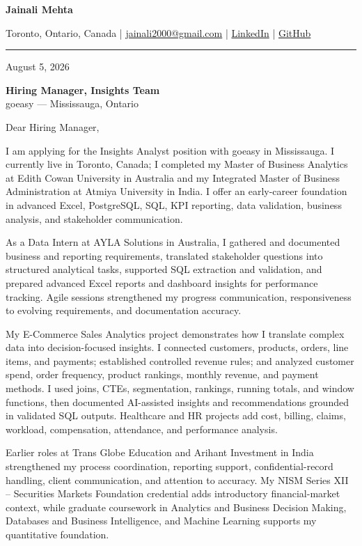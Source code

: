\documentclass[letterpaper,10pt]{article}
\begin{document}
\begin{center}
  {\fontsize{17}{19}\selectfont\textbf{Jainali Mehta}}\par\vspace{2pt}
  \small Toronto, Ontario, Canada \;|\;
  \href{mailto:jainali2000@gmail.com}{jainali2000@gmail.com} \;|\;
  \href{https://www.linkedin.com/in/jainali-mehta}{LinkedIn} \;|\;
  \href{https://github.com/jainalimehta}{GitHub}
\end{center}
\vspace{-5pt}
\noindent\rule{\textwidth}{0.4pt}

August 5, 2026

\textbf{Hiring Manager, Insights Team}\\
goeasy --- Mississauga, Ontario

Dear Hiring Manager,

I am applying for the Insights Analyst position with goeasy in Mississauga. I currently live in Toronto, Canada; I completed my Master of Business Analytics at Edith Cowan University in Australia and my Integrated Master of Business Administration at Atmiya University in India. I offer an early-career foundation in advanced Excel, PostgreSQL, SQL, KPI reporting, data validation, business analysis, and stakeholder communication.

As a Data Intern at AYLA Solutions in Australia, I gathered and documented business and reporting requirements, translated stakeholder questions into structured analytical tasks, supported SQL extraction and validation, and prepared advanced Excel reports and dashboard insights for performance tracking. Agile sessions strengthened my progress communication, responsiveness to evolving requirements, and documentation accuracy.

My E-Commerce Sales Analytics project demonstrates how I translate complex data into decision-focused insights. I connected customers, products, orders, line items, and payments; established controlled revenue rules; and analyzed customer spend, order frequency, product rankings, monthly revenue, and payment methods. I used joins, CTEs, segmentation, rankings, running totals, and window functions, then documented AI-assisted insights and recommendations grounded in validated SQL outputs. Healthcare and HR projects add cost, billing, claims, workload, compensation, attendance, and performance analysis.

Earlier roles at Trans Globe Education and Arihant Investment in India strengthened my process coordination, reporting support, confidential-record handling, client communication, and attention to accuracy. My NISM Series XII -- Securities Markets Foundation credential adds introductory financial-market context, while graduate coursework in Analytics and Business Decision Making, Databases and Business Intelligence, and Machine Learning supports my quantitative foundation.
\end{document}
